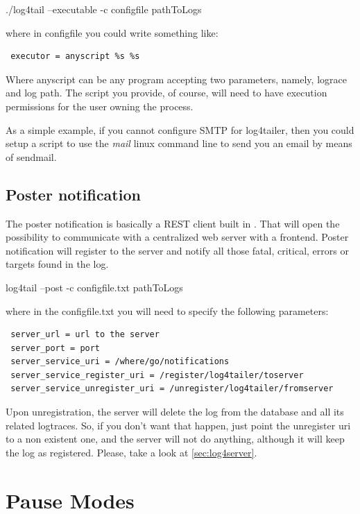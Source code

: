 \begin{cmd}
 ./log4tail --executable -c configfile pathToLogs
\end{cmd}

where in configfile you could write something like:

\begin{verbatim}
 executor = anyscript %s %s 
\end{verbatim}

Where anyscript can be any program accepting two parameters, namely, lograce and log path. The script 
you provide, of course, will need to have execution permissions for the user 
owning the \logftailer{} process. 

As a simple example, if you cannot configure SMTP for log4tailer, then you could 
setup a script to use the \emph{mail} linux command line to send you an email by means of sendmail.

\subsection{Poster notification}
\label{sec:poster}
The poster notification is basically a REST client built in \logftailer{}. That will open 
the possibility to communicate with a centralized web server with a frontend. Poster 
notification will register to the server and notify all those fatal, critical, errors or 
targets found in the log. 
\begin{cmd}
 log4tail --post -c configfile.txt pathToLogs
\end{cmd}
where in the configfile.txt you will need to specify the following parameters:

\begin{config}
\begin{verbatim}
 server_url = url to the server
 server_port = port
 server_service_uri = /where/go/notifications
 server_service_register_uri = /register/log4tailer/toserver
 server_service_unregister_uri = /unregister/log4tailer/fromserver
\end{verbatim}
\end{config}

Upon unregistration, the server will delete the log from the database and all its related 
logtraces. So, if you don't want that happen, just point the unregister uri to a non existent one, 
and the server will not do anything, although it will keep the log as registered. Please, take a 
look at \autoref{sec:log4server}.

\section{Pause Modes}

